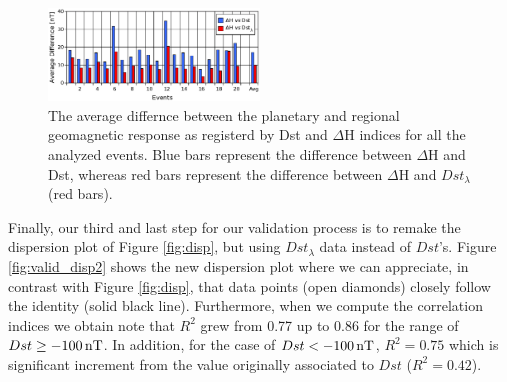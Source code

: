 \documentclass[a4paper,fleqn]{cas-dc}
\begin{document}


\begin{figure}
\centering
    \includegraphics[width=0.5\textwidth]{images/prom_dist.eps}
    \caption{The average differnce between the planetary and regional geomagnetic response as registerd by Dst and $\Delta$H indices for all the analyzed events. Blue bars represent the difference between $\Delta$H and Dst, whereas red bars represent the difference between $\Delta$H and $Dst_\lambda$ (red bars).}
    \label{fig:valid}
\end{figure}


Finally, our third and last step for our validation process is to remake the dispersion plot of Figure \ref{fig:disp}, but using $Dst_\lambda$ data instead of $Dst$'s. Figure \ref{fig:valid_disp2} shows the new dispersion plot where we can appreciate, in contrast with Figure \ref{fig:disp}, that data points (open diamonds) closely follow the identity (solid black line). Furthermore, when we compute the correlation indices we obtain note that $R^2$ grew from 0.77 up to 0.86 for the range of $Dst \ge -100\, {\rm nT}$. In addition, for the case of $Dst < -100\, {\rm nT}$, $R^2=0.75$ which is significant increment from the value originally associated to $Dst$ ($R^2=0.42$).

\end{document}
